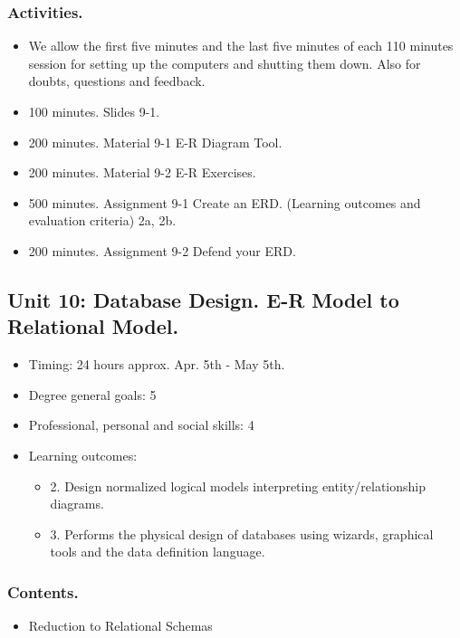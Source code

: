 \documentclass[catalan, a4paper, 12pt, titlepage]{article}
\begin{document}
  \subsubsection{Activities.}
  \begin{itemize}
          \item We allow the first five minutes and the last five minutes of each 110 minutes session for setting up the computers and shutting them down. Also for doubts, questions and feedback.
	  \item 100 minutes. Slides 9-1.
	  \item 200 minutes. Material 9-1 E-R Diagram Tool.
	  \item 200 minutes. Material 9-2 E-R Exercises.
	  \item 500 minutes. Assignment 9-1 Create an ERD. (\faGraduationCap Learning outcomes and evaluation criteria) 2a, 2b.
	  \item 200 minutes. Assignment 9-2 Defend your ERD.
  \end{itemize}


  \subsection{Unit 10: Database Design. E-R Model to Relational Model.}

  \begin{itemize}
	\item Timing: 24 hours approx. Apr. 5th - May 5th.
	\item Degree general goals: 5
	\item Professional, personal and social skills: 4
	\item Learning outcomes: 
		\begin{itemize}
			\item 2. Design normalized logical models interpreting entity/relationship diagrams.
			\item 3. Performs the physical design of databases using wizards, graphical tools and the data definition language.
		\end{itemize}
  \end{itemize}

  \subsubsection{Contents.}
  \begin{itemize}
	\item Reduction to Relational Schemas
  \end{itemize}
\end{document}
